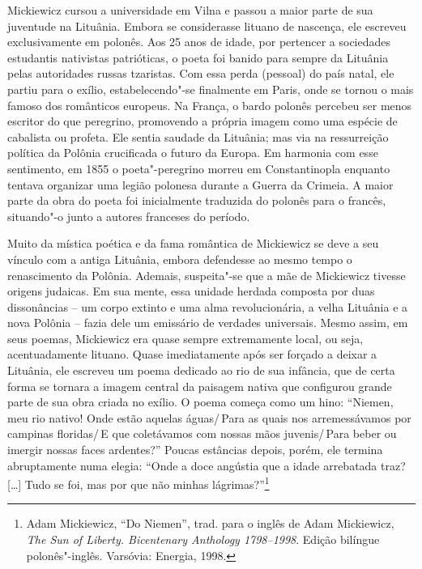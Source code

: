 Mickiewicz cursou a universidade em Vilna e passou a maior parte de sua
juventude na Lituânia. Embora se considerasse lituano de nascença, ele
escreveu exclusivamente em polonês. Aos 25 anos de idade, por
pertencer a sociedades estudantis nativistas patrióticas, o poeta foi
banido para sempre da Lituânia pelas autoridades russas tzaristas. Com
essa perda (pessoal) do país natal, ele partiu para o exílio,
estabelecendo"-se finalmente em Paris, onde se tornou o mais famoso dos
românticos europeus. Na França, o bardo polonês percebeu ser menos
escritor do que peregrino, promovendo a própria imagem como uma espécie
de cabalista ou profeta. Ele sentia saudade da Lituânia; mas via na
ressurreição política da Polônia crucificada o futuro da Europa. Em
harmonia com esse sentimento, em 1855 o poeta"-peregrino morreu em
Constantinopla enquanto tentava organizar uma legião polonesa durante a
Guerra da Crimeia. A maior parte da obra do poeta foi inicialmente
traduzida do polonês para o francês, situando"-o junto a autores
franceses do período.

Muito da mística poética e da fama romântica de Mickiewicz se deve a seu
vínculo com a antiga Lituânia, embora defendesse ao mesmo tempo o
renascimento da Polônia. Ademais, suspeita"-se que a mãe de Mickiewicz
tivesse origens judaicas. Em sua mente, essa unidade herdada composta
por duas dissonâncias -- um corpo extinto e uma alma revolucionária, a
velha Lituânia e a nova Polônia -- fazia dele um emissário de verdades
universais. Mesmo assim, em seus poemas, Mickiewicz era quase sempre
extremamente local, ou seja, acentuadamente lituano. Quase imediatamente
após ser forçado a deixar a Lituânia, ele escreveu um poema dedicado ao
rio de sua infância, que de certa forma se tornara a imagem central da
paisagem nativa que configurou grande parte de sua obra criada no
exílio. O poema começa como um hino: ``Niemen, meu rio nativo! Onde
estão aquelas águas/\,Para as quais nos arremessávamos por campinas
floridas/\,E que coletávamos com nossas mãos juvenis/\,Para beber ou
imergir nossas faces ardentes?'' Poucas estâncias depois, porém, ele
termina abruptamente numa elegia: ``Onde a doce angústia que a idade
arrebatada traz? [\ldots{}] Tudo se foi, mas por que não minhas
lágrimas?''\footnote{Adam Mickiewicz, ``Do Niemen'', trad. para o
  inglês de Adam Mickiewicz, \textit{The Sun of Liberty. Bicentenary
  Anthology 1798--1998}. Edição bilíngue polonês"-inglês. Varsóvia:
  Energia, 1998.}

